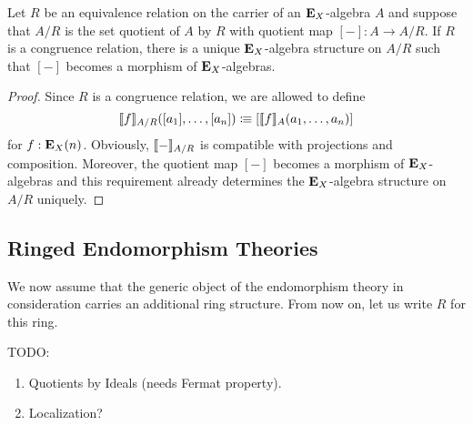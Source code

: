 {\begin{lemma}
  Let \(R\) be an equivalence relation on the carrier of an \(\mathbf{E}_X\)-algebra \(A\) and suppose that \(A/R\) is the set quotient of \(A\) by \(R\) with quotient map \([-]:A \to A/R\).
  If \(R\) is a congruence relation, there is a unique \(\mathbf{E}_X\)-algebra structure on \(A/R\) such that \([-]\) becomes a morphism of \(\mathbf{E}_X\)-algebras.
\end{lemma}
\begin{proof}
  Since \(R\) is a congruence relation, we are allowed to define
  \[
    \llbracket f\rrbracket_{A/R}([a_1],\dots,[a_n]) \vcentcolon\mspace{-1.2mu}\equiv [\llbracket f\rrbracket_A(a_1,\dots,a_n)]
  \]
  for \(f:\mathbf{E}_X(n)\).
  Obviously, \(\llbracket-\rrbracket_{A/R}\) is compatible with projections and composition.
  Moreover, the quotient map \([-]\) becomes a morphism of \(\mathbf{E}_X\)-algebras and this requirement already determines the \(\mathbf{E}_X\)-algebra structure on \(A/R\) uniquely.
\end{proof}

\subsection{Ringed Endomorphism Theories}

We now assume that the generic object of the endomorphism theory in consideration carries an additional ring structure.
From now on, let us write \(R\) for this ring.

TODO:
\begin{enumerate}
  \item Quotients by Ideals (needs Fermat property).
  \item Localization?
\end{enumerate}

}
